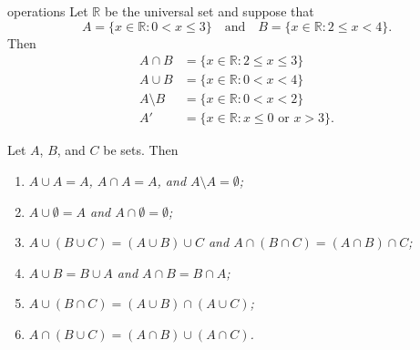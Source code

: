 \begin{example}{operations}
Let ${\mathbb R}$ be the universal set and suppose that
\[
A = \{ x \in {\mathbb R} : 0 < x \leq 3 \}
\quad \text{and} \quad
B = \{ x \in {\mathbb R} : 2 \leq x < 4 \}.
\]
Then
\begin{align*}
A \cap B & =  \{ x \in {\mathbb R} : 2 \leq x \leq 3 \} \\
A \cup B & =  \{ x \in {\mathbb R} : 0 < x < 4 \} \\
A \setminus B & =  \{ x \in {\mathbb R} : 0 < x < 2  \} \\
A' & =  \{ x \in {\mathbb R} : x \leq 0 \text{ or } x > 3 \}.
\end{align*}
\end{example}
 
\begin{proposition}
Let $A$, $B$, and $C$ be sets. Then
\begin{enumerate}
 
\rm\item\it
$A \cup A = A$, $A \cap A = A$, and $A \setminus A = \emptyset$;
 
\rm\item\it
$A \cup \emptyset = A$ and $A \cap \emptyset = \emptyset$;
 
\rm\item\it
$A \cup (B \cup C) = (A \cup B) \cup C$ and  $A \cap (B \cap C) = (A \cap B) \cap C$;
 
\rm\item\it
$A \cup B = B \cup A$ and $A \cap B = B \cap A$;
 
\rm\item\it
$A \cup (B \cap C) = (A \cup B) \cap (A \cup C)$;
 
\rm\item\it
$A \cap (B \cup C) = (A \cap B) \cup (A \cap C)$.
 
\end{enumerate}
\end{proposition}

